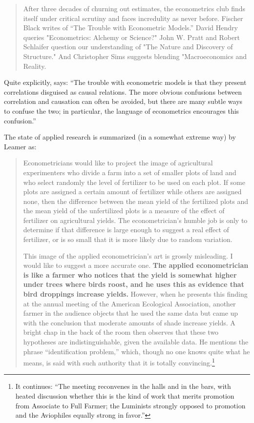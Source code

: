 \documentclass{tufte-handout}
\theoremstyle{break}
\begin{document}
\begin{quote}
  After three decades of churning out estimates, the econometrics club finds itself under critical scrutiny and faces incredulity as never before. Fischer Black writes of ``The Trouble with Econometric Models.'' David Hendry queries "Econometrics: Alchemy or Science?" John W. Pratt and Robert Schlaifer question our understanding of "The Nature and Discovery of Structure." And Christopher Sims suggests blending "Macroeconomics and Reality.
\end{quote}

Quite explicitly, \citet{black1982trouble} says: ``The trouble with econometric models is that they present correlations disguised as causal relations. The more obvious confusions between correlation and causation can often be avoided, but there are many subtle ways to confuse the two; in particular, the language of econometrics encourages this confusion.''

The state of applied research is summarized (in a somewhat extreme way) by Leamer as:

\begin{quote}
  Econometricians would like to project the image of agricultural experimenters who divide a farm into a set of smaller plots of land and who select randomly the level of fertilizer to be used on each plot. If some plots are assigned a certain amount of fertilizer while others are assigned none, then the difference between the mean yield of the fertilized plots and the mean yield of the unfertilized plots is a measure of the effect of fertilizer on agricultural yields. The econometrician's humble job is only to determine if that difference is large enough to suggest a real effect of fertilizer, or is so small that it is more likely due to random variation.

  This image of the applied econometrician's art is grossly misleading. I would like to suggest a more accurate one. \textbf{The applied econometrician is like a farmer who notices that the yield is somewhat higher under trees where birds roost, and he uses this as evidence that bird droppings increase yields.} However, when he presents this finding at the annual meeting of the American Ecological Association, another farmer in the audience objects that he used the same data but came up with the conclusion that moderate amounts of shade increase yields. A bright chap in the back of the room then observes that these two hypotheses are indistinguishable, given the available data. He mentions the phrase ``identification problem,'' which, though no one knows quite what he means, is said with such authority that it is totally convincing.\footnote{It continues: ``The meeting reconvenes in the halls and in the bars, with heated discussion whether this is the kind of work that merits promotion from Associate to Full Farmer; the Luminists strongly opposed to promotion and the Aviophiles equally strong in favor.''}
\end{quote}
\end{document}
